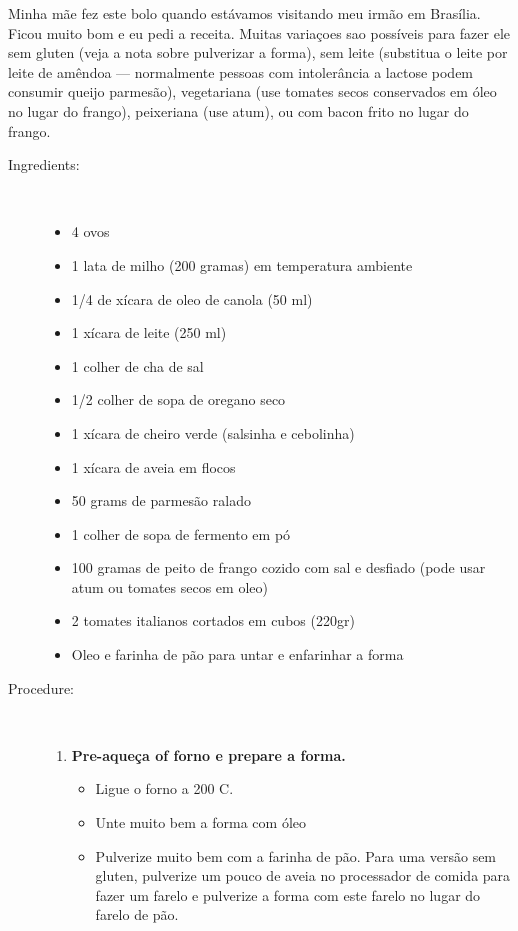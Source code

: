 \documentclass[11pt,letterpaper]{article}
\begin{document}


Minha m\~ae fez este bolo quando est\'avamos visitando meu irm\~ao em Bras\'ilia. Ficou muito bom e eu pedi a receita. Muitas varia\c{c}oes sao poss\'iveis para fazer ele sem gluten (veja a nota sobre pulverizar a forma), sem leite (substitua o leite por leite de am\^endoa --- normalmente pessoas com intoler\^ancia a lactose podem consumir queijo parmes\~ao),  vegetariana (use tomates secos conservados em \'oleo no lugar do frango), peixeriana (use atum), ou com bacon frito no lugar do frango.
 
\begin{description}

\item[Ingredients:]\ \\
	\begin{itemize}
	\item 4 ovos
	\item 1 lata de milho (200 gramas) em temperatura ambiente
	\item 1/4 de x\'icara de oleo de canola (50 ml)
	\item 1 x\'icara de leite (250 ml)
	\item 1 colher de cha de sal
	\item 1/2 colher de sopa de oregano seco
	\item 1 x\'icara de cheiro verde (salsinha e cebolinha)
	\item 1 x\'icara de aveia em flocos
	\item 50 grams de parmes\~ao ralado
	\item 1 colher de sopa de fermento em p\'o
	\item 100 gramas de peito de frango cozido com sal e desfiado (pode usar atum ou tomates secos em oleo)
	\item 2 tomates italianos cortados em cubos (220gr)
	\item Oleo e farinha de p\~ao para untar e enfarinhar a forma
	\end{itemize}

\item[Procedure:]\ \\
	\begin{enumerate}
	\item {\bf Pre-aque\c{c}a of forno e prepare a forma.}
	\begin{itemize}
	\item Ligue o forno a 200 C.
	\item Unte muito bem a forma com \'oleo
	\item Pulverize muito bem com a farinha de p\~ao. Para uma vers\~ao sem gluten, pulverize um pouco de aveia no processador de comida para fazer um farelo e pulverize a forma com este farelo no lugar do farelo de p\~ao.
	\end{itemize}
	

\end{enumerate}
\end{description}
\end{document}
